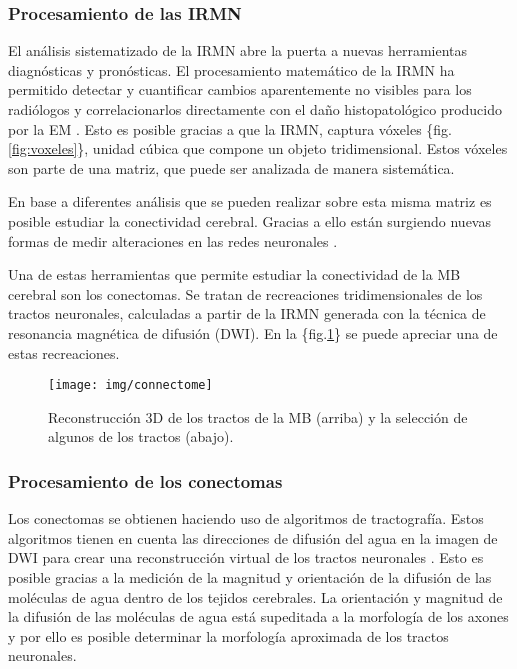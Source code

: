 \documentclass[fleqn,12pt]{UICArticle} %
\begin{document}
\subsubsection{Procesamiento de las IRMN}

El análisis sistematizado de la IRMN abre la puerta a nuevas herramientas diagnósticas y pronósticas. El procesamiento matemático de la IRMN ha permitido detectar y cuantificar cambios aparentemente no visibles para los radiólogos y correlacionarlos directamente con el daño histopatológico producido por la EM \cite{Beer2016, Nedjati-Gilani2017}. Esto es posible gracias a que la IRMN, captura vóxeles \{fig.\ref{fig:voxeles}\}, unidad cúbica que compone un objeto tridimensional. Estos vóxeles son parte de una matriz, que puede ser analizada de manera sistemática.
 
En base a diferentes análisis que se pueden realizar sobre esta misma matriz es posible estudiar la conectividad cerebral. Gracias a ello están surgiendo nuevas formas de medir alteraciones en las redes neuronales \cite{Johansen2006}.

Una de estas herramientas que permite estudiar la conectividad de la MB cerebral son los conectomas. Se tratan de recreaciones tridimensionales de los tractos neuronales, calculadas a partir de la IRMN generada con la técnica de resonancia magnética de difusión (DWI). En la \{fig.\ref{fig:connectome}\} se puede apreciar una de estas recreaciones.

\begin{figure}[h]
	\centering
	\texttt{[image: img/connectome]}
	\caption{Reconstrucción 3D de los tractos de la MB (arriba) y la selección de algunos de los tractos (abajo).}
	\label{fig:connectome}
\end{figure}


\subsubsection{Procesamiento de los conectomas}

Los conectomas se obtienen haciendo uso de algoritmos de tractografía. Estos algoritmos tienen en cuenta las direcciones de difusión del agua en la imagen de DWI para crear una reconstrucción virtual de los tractos neuronales \cite{Mori2002}. Esto es posible gracias a la medición de la magnitud y orientación de la difusión de las moléculas de agua dentro de los tejidos cerebrales. La orientación y magnitud de la difusión de las moléculas de agua está supeditada a la morfología de los axones \cite{Johansen2006} y por ello es posible determinar la morfología aproximada de los tractos neuronales.
\end{document}
